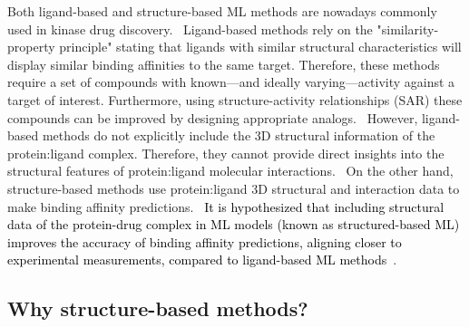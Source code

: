 \documentclass[9pt,lessons, pubversion]{livecoms}
\newcommand{\revision}[1]{\textcolor{black}{#1}}
\begin{document}
Both ligand-based and structure-based ML methods are nowadays commonly used in kinase drug discovery.~\cite{sliwoski2014computational, abuhammad2016innovative, vazquez2020merging, liu2023hybrid, backenkohler2023guided, gorantla2023proteins}
Ligand-based methods rely on the "similarity-property principle" \cite{amendola2021pyrmd} stating that ligands with similar structural characteristics will display similar binding affinities to the same target. 
Therefore, these methods require a set of compounds with known---and ideally varying---activity against a target of interest. Furthermore, using structure-activity relationships (SAR) these compounds can be improved by designing appropriate analogs.~\cite{amendola2021pyrmd, chen2007evaluation, abuhammad2016innovative} %
However, ligand-based methods do not explicitly include the 3D structural information of the protein:ligand complex. Therefore, they cannot provide direct insights into the structural features of protein:ligand molecular interactions.~\cite{liu2023hybrid} On the other hand, structure-based methods use protein:ligand 3D structural and interaction data to make binding affinity predictions.~\cite{liu2023hybrid, schaller2023benchmarking} \revision{It is hypothesized that including structural data of the protein-drug complex in ML models (known as structured-based ML) improves the accuracy of binding affinity predictions, aligning closer to experimental measurements, compared to ligand-based ML methods}~\cite{schaller2023benchmarking, backenkohler2023guided}. 

\subsection{Why structure-based methods?}
\end{document}
